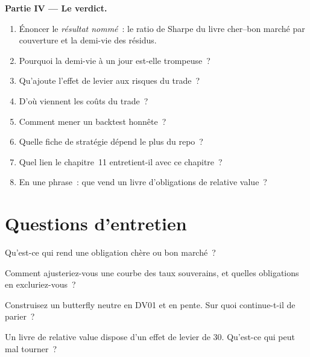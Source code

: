 \begin{problem}
\medskip\noindent\textbf{Partie IV --- Le verdict.}
\begin{enumerate}[resume]
\item Énoncer le \emph{résultat nommé}~: le ratio de Sharpe du livre cher--bon marché par couverture et la demi-vie des résidus.
\item Pourquoi la demi-vie à un jour est-elle trompeuse~?
\item Qu'ajoute l'effet de levier aux risques du trade~?
\item D'où viennent les coûts du trade~?
\item Comment mener un backtest honnête~?
\item Quelle fiche de stratégie dépend le plus du repo~?
\item Quel lien le chapitre~11 entretient-il avec ce chapitre~?
\item En une phrase~: que vend un livre d'obligations de relative value~?
\end{enumerate}
\end{problem}

\section{Questions d'entretien}

\begin{interviewq}\label{iq:s2:government-bond-relative-value:1}
Qu'est-ce qui rend une obligation chère ou bon marché~?
\end{interviewq}

\begin{interviewq}\label{iq:s2:government-bond-relative-value:2}
Comment ajusteriez-vous une courbe des taux souverains, et quelles obligations en excluriez-vous~?
\end{interviewq}

\begin{interviewq}\label{iq:s2:government-bond-relative-value:3}
Construisez un butterfly neutre en DV01 et en pente. Sur quoi continue-t-il de parier~?
\end{interviewq}

\begin{interviewq}\label{iq:s2:government-bond-relative-value:4}
Un livre de relative value dispose d'un effet de levier de 30. Qu'est-ce qui peut mal tourner~?
\end{interviewq}

